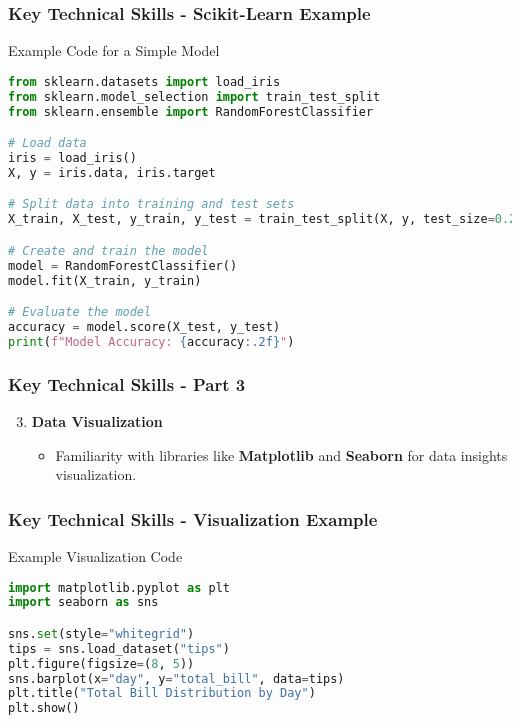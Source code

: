 \documentclass[aspectratio=169]{beamer}
\begin{document}
\begin{frame}[fragile]
    \frametitle{Key Technical Skills - Scikit-Learn Example}
    \begin{block}{Example Code for a Simple Model}
    \begin{lstlisting}[language=Python]
from sklearn.datasets import load_iris
from sklearn.model_selection import train_test_split
from sklearn.ensemble import RandomForestClassifier

# Load data
iris = load_iris()
X, y = iris.data, iris.target

# Split data into training and test sets
X_train, X_test, y_train, y_test = train_test_split(X, y, test_size=0.2)

# Create and train the model
model = RandomForestClassifier()
model.fit(X_train, y_train)

# Evaluate the model
accuracy = model.score(X_test, y_test)
print(f"Model Accuracy: {accuracy:.2f}")
    \end{lstlisting}
    \end{block}
\end{frame}

\begin{frame}
    \frametitle{Key Technical Skills - Part 3}
    \begin{enumerate}
        \setcounter{enumi}{2}
        \item \textbf{Data Visualization}
        \begin{itemize}
            \item Familiarity with libraries like \textbf{Matplotlib} and \textbf{Seaborn} for data insights visualization.
        \end{itemize}
    \end{enumerate}
\end{frame}

\begin{frame}[fragile]
    \frametitle{Key Technical Skills - Visualization Example}
    \begin{block}{Example Visualization Code}
    \begin{lstlisting}[language=Python]
import matplotlib.pyplot as plt
import seaborn as sns

sns.set(style="whitegrid")
tips = sns.load_dataset("tips")
plt.figure(figsize=(8, 5))
sns.barplot(x="day", y="total_bill", data=tips)
plt.title("Total Bill Distribution by Day")
plt.show()
    \end{lstlisting}
    \end{block}
\end{frame}
\end{document}
